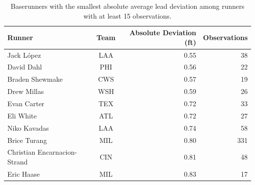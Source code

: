 \begin{table}[!htbp]
\centering
\small
\caption{Baserunners with the smallest absolute average lead deviation among runners with at least 15 observations.}
\label{tab:runners_closest}

\begin{tabular}{lcrr}
\toprule
Runner & Team & Absolute Deviation (ft) & Observations\\
\midrule
Jack López & LAA & 0.55 & 38\\
David Dahl & PHI & 0.56 & 22\\
Braden Shewmake & CWS & 0.57 & 19\\
Drew Millas & WSH & 0.59 & 26\\
Evan Carter & TEX & 0.72 & 33\\
Eli White & ATL & 0.72 & 27\\
Niko Kavadas & LAA & 0.74 & 58\\
Brice Turang & MIL & 0.80 & 331\\
Christian Encarnacion-Strand & CIN & 0.81 & 48\\
Eric Haase & MIL & 0.83 & 17\\
\bottomrule
\end{tabular}
\end{table}
